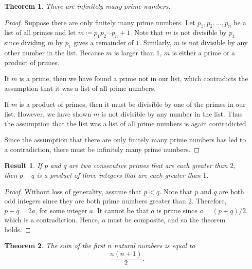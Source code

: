\documentclass[headings=standardclasses]{scrartcl}
\newtheorem{theorem}{Theorem}
\newtheorem{result}{Result}
\theoremstyle{definition}
\begin{document}
\begin{theorem}
  There are infinitely many prime numbers.
\end{theorem}

\begin{proof}
  Suppose there are only finitely many prime numbers. Let \(p_1, p_2, \ldots,
  p_n\) be a list of all primes and let \(m ≔ p_{1}p_{2} \cdots p_n + 1\). Note
  that \(m\) is not divisible by \(p_1\) since dividing \(m\) by \(p_1\) gives
  a remainder of \(1\). Similarly, \(m\) is not divisible by any other number
  in the list. Because \(m\) is larger than \(1\), \(m\) is either a prime or a
  product of primes.

  If \(m\) is a prime, then we have found a prime not in our list, which
  contradicts the assumption that it was a list of all prime numbers.

  If \(m\) is a product of primes, then it must be divisible by one of the
  primes in our list. However, we have shown \(m\) is not divisible by any
  number in the list. Thus the assumption that the list was a list of all prime
  numbers is again contradicted.

  Since the assumption that there are only finitely many prime numbers has led
  to a contradiction, there must be infinitely many prime numbers.
\end{proof}

\begin{result}
  If \(p\) and \(q\) are two consecutive primes that are each greater than
  \(2\), then \(p + q\) is a product of three integers that are each greater
  than \(1\).
\end{result}

\begin{proof}
  Without loss of generality, assume that \(p < q\). Note that \(p\) and \(q\)
  are both odd integers since they are both prime numbers greater than \(2\).
  Therefore, \(p + q = 2a\), for some integer \(a\). It cannot be that \(a\) is
  prime since \(a = (p + q)/2\), which is a contradiction. Hence, \(a\) must be
  composite, and so the theorem holds.
\end{proof}

\begin{theorem}
  The sum of the first \(n\) natural numbers is equal to
  \[ \frac{n(n + 1)}{2}. \]
\end{theorem}
\end{document}
